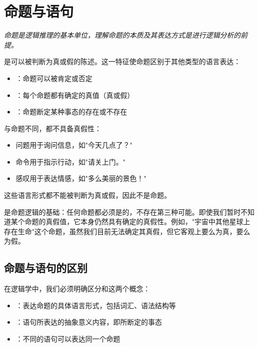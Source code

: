 \section{命题与语句}

\begin{logicbox}[title=引言]
\textit{命题是逻辑推理的基本单位，理解命题的本质及其表达方式是进行逻辑分析的前提。}
\end{logicbox}

是可以被判断为真或假的陈述。这一特征使命题区别于其他类型的语言表达：

\begin{theorembox}[title=命题的基本特征]
\begin{itemize}
  \item {}：命题可以被肯定或否定
  \item {}：每个命题都有确定的真值（真或假）
  \item {}：命题断定某种事态的存在或不存在
\end{itemize}
\end{theorembox}

与命题不同，都不具备真假性：
\begin{itemize}
  \item 问题用于询问信息，如"今天几点了？"
  \item 命令用于指示行动，如"请关上门。"
  \item 感叹用于表达情感，如"多么美丽的景色！"
\end{itemize}

这些语言形式都不能被判断为真或假，因此不是命题。

是命题逻辑的基础：任何命题都必须是的，不存在第三种可能。即使我们暂时不知道某个命题的真假值，它本身仍然具有确定的真假性。例如，"宇宙中其他星球上存在生命"这个命题，虽然我们目前无法确定其真假，但它客观上要么为真，要么为假。

\subsection{命题与语句的区别}

在逻辑学中，我们必须明确区分和这两个概念：

\begin{theorembox}[title=命题与语句的区别]
\begin{itemize}
  \item {}：表达命题的具体语言形式，包括词汇、语法结构等
  \item {}：语句所表达的抽象意义内容，即所断定的事态
  \item {}：不同的语句可以表达同一个命题
\end{itemize}
\end{theorembox}

